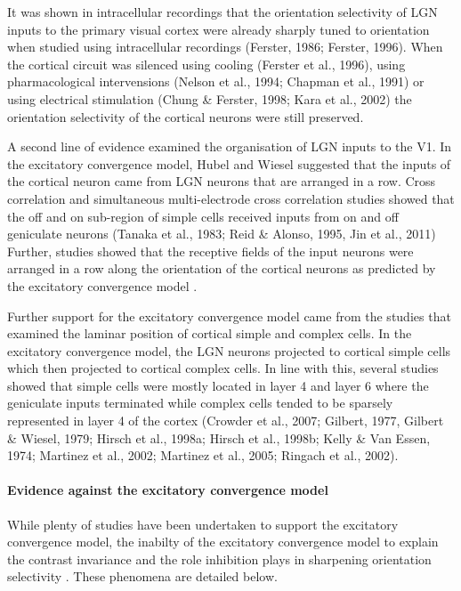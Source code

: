 It was shown in intracellular recordings that the orientation selectivity of LGN inputs to the primary visual cortex were already sharply tuned to orientation when studied using intracellular recordings (Ferster, 1986; Ferster, 1996). When the cortical circuit was silenced using cooling (Ferster et al., 1996), using pharmacological intervensions (Nelson et al., 1994; Chapman et al., 1991) or using electrical stimulation (Chung \& Ferster, 1998; Kara et al., 2002) the orientation selectivity of the cortical neurons were still preserved.

A second line of evidence examined the organisation of LGN inputs to the V1. In the excitatory convergence model, Hubel and Wiesel suggested that the inputs of the cortical neuron came from LGN neurons that are arranged in a row. Cross correlation and simultaneous multi-electrode cross correlation studies showed that the off and on sub-region of simple cells received inputs from on and off geniculate neurons (Tanaka et al., 1983; Reid \& Alonso, 1995, Jin et al., 2011) Further, studies showed that the receptive fields of the input neurons were arranged in a row along the orientation of the cortical neurons as predicted by the excitatory convergence model \cite{Mooser2004a, ClayReid1995}.

Further support for the excitatory convergence model came from the studies that examined the laminar position of cortical simple and complex cells. In the excitatory convergence model, the LGN neurons projected to cortical simple cells which then projected to cortical complex cells. In line with this, several studies showed that simple cells were mostly located in layer 4 and layer 6 where the geniculate inputs terminated while complex cells tended to be sparsely represented in layer 4 of the cortex (Crowder et al., 2007; Gilbert, 1977, Gilbert \& Wiesel, 1979; Hirsch et al., 1998a; Hirsch et al., 1998b; Kelly \& Van Essen, 1974; Martinez et al., 2002; Martinez et al., 2005; Ringach et al., 2002).

\paragraph{Evidence against the excitatory convergence model}

While plenty of studies have been undertaken to support the excitatory convergence model, the inabilty of the excitatory convergence model to explain the contrast invariance \cite{Sclar1982} and the role inhibition plays in sharpening orientation selectivity \cite{Creutzfeldt1974, Sillito1975}. These phenomena are detailed below.
 
